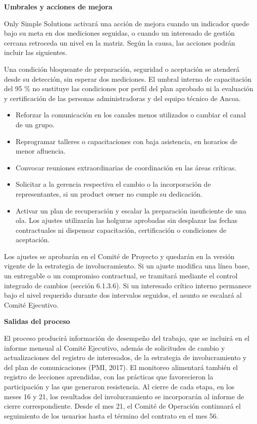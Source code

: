 \documentclass[11pt]{article}
\begin{document}
\textbf{Umbrales y acciones de mejora}

Only Simple Solutions activará una acción de mejora cuando un indicador
quede bajo su meta en dos mediciones seguidas, o cuando un interesado de
gestión cercana retroceda un nivel en la matriz. Según la causa, las
acciones podrán incluir las siguientes.

Una condición bloqueante de preparación, seguridad o aceptación se
atenderá desde su detección, sin esperar dos mediciones. El umbral
interno de capacitación del 95 \% no sustituye las condiciones por
perfil del plan aprobado ni la evaluación y certificación de las personas
administradoras y del equipo técnico de Ancoa.

\begin{itemize}
\item
  Reforzar la comunicación en los canales menos utilizados o cambiar el
  canal de un grupo.
\item
  Reprogramar talleres o capacitaciones con baja asistencia, en horarios
  de menor afluencia.
\item
  Convocar reuniones extraordinarias de coordinación en las áreas
  críticas.
\item
  Solicitar a la gerencia respectiva el cambio o la incorporación de
  representantes, si un product owner no cumple su dedicación.
\item
  Activar un plan de recuperación y escalar la preparación insuficiente
  de una ola. Los ajustes utilizarán las holguras aprobadas sin
  desplazar las fechas contractuales ni dispensar capacitación,
  certificación o condiciones de aceptación.
\end{itemize}

Los ajustes se aprobarán en el Comité de Proyecto y quedarán en la
versión vigente de la estrategia de involucramiento. Si un ajuste
modifica una línea base, un entregable o un compromiso contractual, se
tramitará mediante el control integrado de cambios (sección 6.1.3.6). Si
un interesado crítico interno permanece bajo el nivel requerido durante
dos intervalos seguidos, el asunto se escalará al Comité Ejecutivo.

\textbf{Salidas del proceso}

El proceso producirá información de desempeño del trabajo, que se
incluirá en el informe mensual al Comité Ejecutivo, además de
solicitudes de cambio y actualizaciones del registro de interesados, de
la estrategia de involucramiento y del plan de comunicaciones (PMI,
2017). El monitoreo alimentará también el registro de lecciones
aprendidas, con las prácticas que favorecieron la participación y las
que generaron resistencia. Al cierre de cada etapa, en los meses 16 y
21, los resultados del involucramiento se incorporarán al informe de
cierre correspondiente. Desde el mes 21, el Comité de Operación
continuará el seguimiento de los usuarios hasta el término del contrato
en el mes 56.
\end{document}
